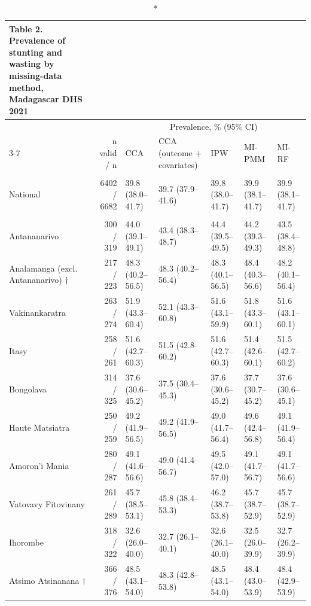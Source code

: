 \begingroup
\fontsize{8.0pt}{10.0pt}\selectfont
\setlength{\LTpost}{0mm}
\begin{longtable}{l|rlllll}
\caption*{
{\fontsize{20}{25}\selectfont  Table 2. Prevalence of stunting and wasting by missing-data method, Madagascar DHS 2021\fontsize{8}{10}\selectfont }
} \\ 
\toprule
 &  & \multicolumn{5}{c}{{Prevalence, \% (95\% CI)}} \\ 
\cmidrule(lr){3-7}
 & n valid / n & CCA & CCA (outcome + covariates) & IPW & MI-PMM & MI-RF \\ 
\midrule\endhead\addlinespace[2.5pt]
\multicolumn{7}{l}{Stunting — National} \\[2.5pt] 
\midrule\addlinespace[2.5pt]
National & 6402 / 6682 & 39.8 (38.0–41.7) & 39.7 (37.9–41.6) & 39.8 (38.0–41.7) & 39.9 (38.1–41.7) & 39.9 (38.1–41.7) \\ 
\midrule\addlinespace[2.5pt]
\multicolumn{7}{l}{Stunting — Region} \\[2.5pt] 
\midrule\addlinespace[2.5pt]
Antananarivo & 300 / 319 & 44.0 (39.1–49.1) & 43.4 (38.3–48.7) & 44.4 (39.5–49.5) & 44.2 (39.3–49.3) & 43.5 (38.4–48.8) \\ 
Analamanga (excl. Antananarivo) † & 217 / 223 & 48.3 (40.2–56.5) & 48.3 (40.2–56.4) & 48.3 (40.1–56.5) & 48.4 (40.3–56.6) & 48.2 (40.1–56.4) \\ 
Vakinankaratra & 263 / 274 & 51.9 (43.3–60.4) & 52.1 (43.3–60.8) & 51.6 (43.1–59.9) & 51.8 (43.3–60.1) & 51.6 (43.1–60.1) \\ 
Itasy & 258 / 261 & 51.6 (42.7–60.3) & 51.5 (42.8–60.2) & 51.6 (42.7–60.3) & 51.4 (42.6–60.1) & 51.5 (42.7–60.2) \\ 
Bongolava & 314 / 325 & 37.6 (30.6–45.2) & 37.5 (30.4–45.3) & 37.6 (30.6–45.2) & 37.7 (30.7–45.2) & 37.6 (30.6–45.1) \\ 
Haute Matsiatra & 250 / 259 & 49.2 (41.9–56.5) & 49.2 (41.9–56.5) & 49.0 (41.7–56.4) & 49.6 (42.4–56.8) & 49.1 (41.9–56.4) \\ 
Amoron'i Mania & 280 / 287 & 49.1 (41.6–56.6) & 49.0 (41.4–56.7) & 49.5 (42.0–57.0) & 49.1 (41.7–56.7) & 49.1 (41.7–56.6) \\ 
Vatovavy Fitovinany & 261 / 289 & 45.7 (38.5–53.1) & 45.8 (38.4–53.3) & 46.2 (38.7–53.8) & 45.7 (38.7–52.9) & 45.7 (38.7–52.9) \\ 
Ihorombe & 318 / 322 & 32.6 (26.0–40.0) & 32.7 (26.1–40.1) & 32.6 (26.1–40.0) & 32.5 (26.0–39.9) & 32.7 (26.2–39.9) \\ 
Atsimo Atsinanana † & 366 / 376 & 48.5 (43.1–54.0) & 48.3 (42.8–53.8) & 48.5 (43.1–54.0) & 48.4 (43.0–53.9) & 48.4 (42.9–53.9) \\ 

\end{longtable}
